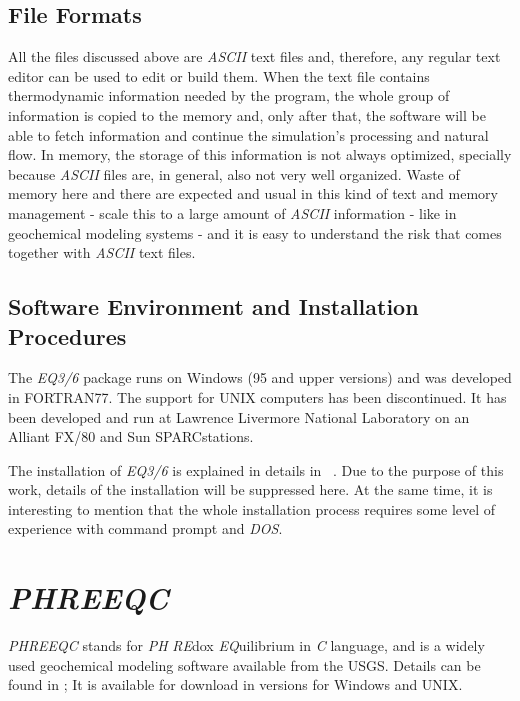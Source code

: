 \subsection{File Formats}
All the files discussed above are \emph{ASCII} text files and, therefore, any regular text editor can be used to edit or build them. When the text file contains thermodynamic information needed by the program, the whole group of information is copied to the memory and, only after that, the software will be able to fetch information and continue the simulation's processing and natural flow. In memory, the storage of this information is not always optimized, specially because \emph{ASCII} files are, in general, also not very well organized. Waste of memory here and there are expected and usual in this kind of text and memory management - scale this to a large amount of \emph{ASCII} information - like in geochemical modeling systems - and it is easy to understand the risk that comes together with \emph{ASCII} text files. 

\subsection{Software Environment and Installation Procedures}
The \emph{EQ3/6} package runs on Windows (95 and upper versions) and was developed in FORTRAN77. The support for UNIX computers has been discontinued.  It has been developed and run at Lawrence Livermore National Laboratory on an Alliant FX/80 and Sun SPARCstations.

The installation of \emph{EQ3/6} is explained in details in ~\cite{Wolery:1992}. Due to the purpose of this work, details of the installation will be suppressed here.
At the same time, it is interesting to mention that the whole installation process requires some level of experience with command prompt and \emph{DOS}.



\section{\emph{PHREEQC}}
\emph{PHREEQC} stands for \emph{PH} \emph{RE}dox \emph{EQ}uilibrium in \emph{C} language, and is a widely used geochemical modeling software available from the USGS. Details can be found in \cite{Parkhurst:95};
It is available for download in versions for Windows and UNIX. 


